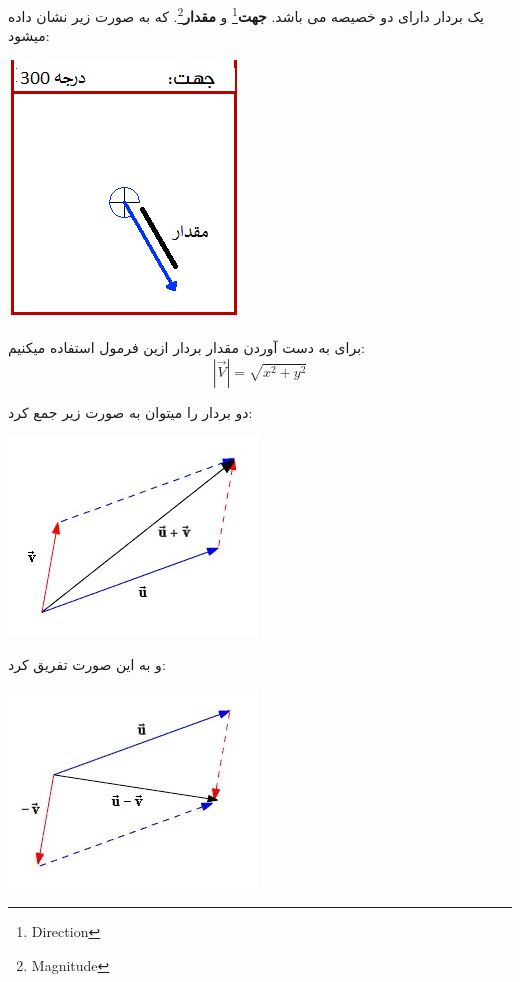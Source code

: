 \documentclass[14pt,a4paper]{memoir}
\begin{document}
	
	
	
یک بردار دارای دو خصیصه می باشد. \textbf{جهت}\footnote{Direction} و \textbf{مقدار}\footnote{Magnitude}. که به صورت زیر نشان داده میشود:

	
		 \begin{center}
		\includegraphics[scale=1]{DirMag}
	\end{center}

برای به دست آوردن مقدار بردار ازین فرمول استفاده میکنیم:
\[ |\vec{V}| =  \sqrt{x^2 + y^2} \]
	
	
	
	 
	 دو بردار را میتوان به صورت زیر جمع کرد:
	 
	 
	 	 \begin{center}
	 	\includegraphics[scale=1]{VectorAdd}
	 \end{center}
 
 و به این صورت تفریق کرد:
  
 \begin{center}
 	\includegraphics[scale=1]{VectorSubtract}
 \end{center}
 
\end{document}
